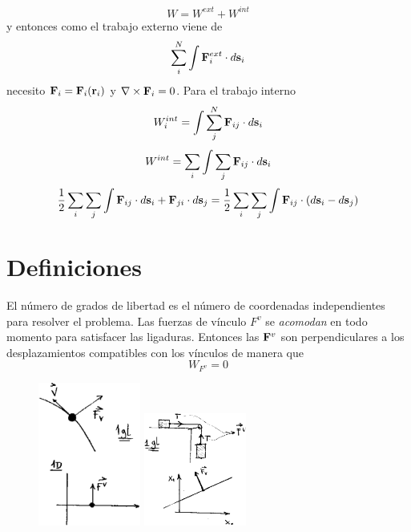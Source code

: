 \documentclass[10pt,oneside]{CBFT_book}
\begin{document}
\[
	W = W^{ext} + W^{int}
\]
y entonces como el trabajo externo viene de 
\[
	\sum_i^N \int \vb{F}^{ext}_i \cdot d\vb{s}_i
\]
necesito $\vb{F}_i = \vb{F}_i(\vb{r}_i)$ y $\nabla \times \vb{F}_i=0$.
Para el trabajo interno
\[
	W_i^{int} = \int \sum_j^N  \vb{F}_{ij} \cdot d\vb{s}_i
\]
\[
	W^{int} = \sum_i \int \sum_j  \vb{F}_{ij} \cdot d\vb{s}_i
\]
\[
	\frac{1}{2} \sum_i \sum_j \int \vb{F}_{ij} \cdot d\vb{s}_i + \vb{F}_{ji} \cdot d\vb{s}_j =
	\frac{1}{2} \sum_i \sum_j \int \vb{F}_{ij} \cdot \left( d\vb{s}_i - d\vb{s}_j \right)
\]

\section{Definiciones}

El número de grados de libertad es el número de coordenadas independientes para resolver el problema.
Las fuerzas de vínculo $F^v$ se {\it acomodan} en todo momento para satisfacer las ligaduras.
Entonces las $\vb{F}^v$ son perpendiculares a los desplazamientos compatibles con los vínculos de
manera que 
\[
	W_{F^v} = 0
\]
\begin{figure}[hbt]
	\begin{center}
	\includegraphics[width=0.3\textwidth]{images/fig_mc_vinculos1.pdf}	 
	\includegraphics[width=0.3\textwidth]{images/fig_mc_vinculos2.pdf}
	\end{center}
	\caption{}
\end{figure} 
\end{document}
